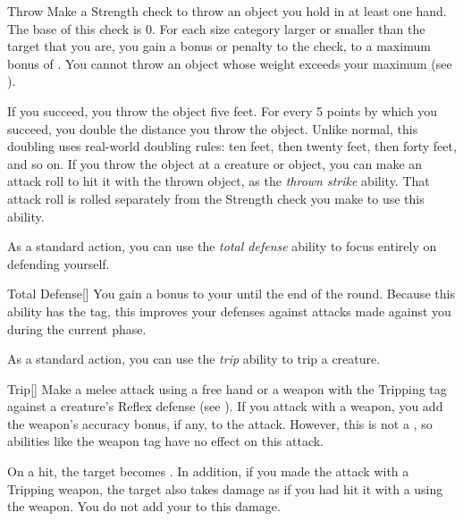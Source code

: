         \begin{activeability}{Throw}
            \rankline
            Make a Strength check to throw an object you hold in at least one hand.
            The base  of this check is 0.
            For each size category larger or smaller than the target that you are, you gain a  bonus or penalty to the check, to a maximum bonus of .
            You cannot throw an object whose weight exceeds your maximum  (see ).

            If you succeed, you throw the object five feet.
            For every 5 points by which you succeed, you double the distance you throw the object.
            Unlike normal, this doubling uses real-world doubling rules: ten feet, then twenty feet, then forty feet, and so on.
            If you throw the object at a creature or object, you can make an attack roll to hit it with the thrown object, as the \textit{thrown strike} ability.
            That attack roll is rolled separately from the Strength check you make to use this ability.
        \end{activeability}

        \label{Total Defense} As a standard action, you can use the \textit{total defense} ability to focus entirely on defending yourself.

        \begin{activeability}{Total Defense}[]
            \rankline
            You gain a  bonus to your  until the end of the round.
            Because this ability has the  tag, this improves your defenses against attacks made against you during the current phase.
        \end{activeability}

        \label{Trip} As a standard action, you can use the \textit{trip} ability to trip a creature.

        \begin{activeability}{Trip}[]
            \rankline
            Make a melee attack using a free hand or a weapon with the Tripping tag against a creature's Reflex defense (see ).
            If you attack with a weapon, you add the weapon's accuracy bonus, if any, to the attack.
            However, this is not a , so abilities like the  weapon tag have no effect on this attack.

            On a hit, the target becomes \prone.
            In addition, if you made the attack with a Tripping weapon, the target also takes damage as if you had hit it with a  using the weapon.
            You do not add your  to this damage.
        \end{activeability}

